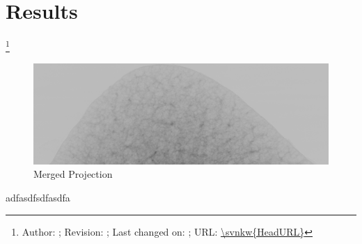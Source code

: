 \section{Results}

\footnote{Author: \svnauthor; Revision: \svnrev; Last changed on: \svndate; URL: \url{\svnkw{HeadURL}}}

\begin{figure}[htbp]
	\centering
		\includegraphics[width=1.00\textwidth]{img/R108C36c_merge0801.png}
	\caption{Merged Projection}
	\label{fig:R108C36c_merge0801}
\end{figure}
adfasdfsdfasdfa
